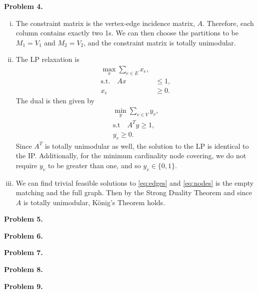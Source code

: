 \documentclass[11pt,a4paper]{article}
\begin{document}
\textbf{Problem 4.}
\begin{enumerate}[i)]
    \item The constraint matrix is the vertex-edge incidence matrix, $A$. Therefore, each column contains exactly two 1s. We can then choose the partitions to be $M_1 = V_1$ and $M_2 = V_2$, and the constraint matrix is totally unimodular.
    \item The LP relaxation is
    \begin{align}
        \nonumber \max_x \sum_{e \in E} x_e, \\
        \text{s.t.} \quad A x &\leq 1, \label{eq:edges} \\
        \nonumber x_e &\geq 0.
    \end{align}
    The dual is then given by
    \begin{align}
        \nonumber \min_y \sum_{v \in V} y_v, \\
        \text{s.t} \quad A^T y \geq 1, \label{eq:nodes} \\
        \nonumber y_v \geq 0.
    \end{align}
    Since $A^T$ is totally unimodular as well, the solution to the LP is identical to the IP. Additionally, for the minimum cardinality node covering, we do not require $y_v$ to be greater than one, and so $y_v \in \{ 0, 1 \}$.
    \item We can find trivial feasible solutions to \eqref{eq:edges} and \eqref{eq:nodes} is the empty matching and the full graph. Then by the Strong Duality Theorem and since $A$ is totally unimodular, K\"{o}nig's Theorem holds.
\end{enumerate}

\textbf{Problem 5.}

\textbf{Problem 6.}

\textbf{Problem 7.}

\textbf{Problem 8.}

\textbf{Problem 9.}


%
\end{document}
